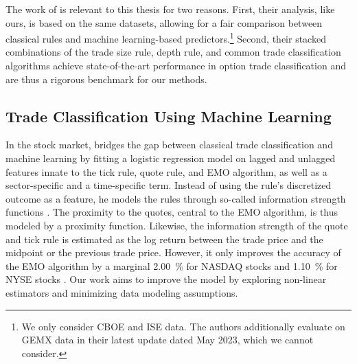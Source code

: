 The work of \textcite[][1--53]{grauerOptionTradeClassification2022} is relevant to this thesis for two reasons. First, their analysis, like ours, is based on the same datasets, allowing for a fair comparison between classical rules and machine learning-based predictors.\footnote{We only consider \gls{CBOE} and \gls{ISE} data. The authors additionally evaluate on GEMX data in their latest update dated May 2023, which we cannot consider.} Second, their stacked combinations of the trade size rule, depth rule, and common trade classification algorithms achieve state-of-the-art performance in option trade classification and are thus a rigorous benchmark for our methods.

\subsection{Trade Classification Using Machine Learning}
\label{sec:trade-classification-using-machine-learning}

In the stock market, \textcite[][396--398]{rosenthalModelingTradeDirection2012} bridges the gap between classical trade classification and machine learning by fitting a logistic regression model on lagged and unlagged features innate to the tick rule, quote rule, and \gls{EMO} algorithm, as well as a sector-specific and a time-specific term. Instead of using the rule's discretized outcome as a feature, he models the rules through so-called information strength functions \autocite[][396--398]{rosenthalModelingTradeDirection2012}. The proximity to the quotes, central to the \gls{EMO} algorithm, is thus modeled by a proximity function. Likewise, the information strength of the quote and tick rule is estimated as the log return between the trade price and the midpoint or the previous trade price. However, it only improves the accuracy of the \gls{EMO} algorithm by a marginal \SI{2.00}{\percent} for \gls{NASDAQ} stocks and \SI{1.10}{\percent} for \gls{NYSE} stocks \autocite[][405]{rosenthalModelingTradeDirection2012}. Our work aims to improve the model by exploring non-linear estimators and minimizing data modeling assumptions.

